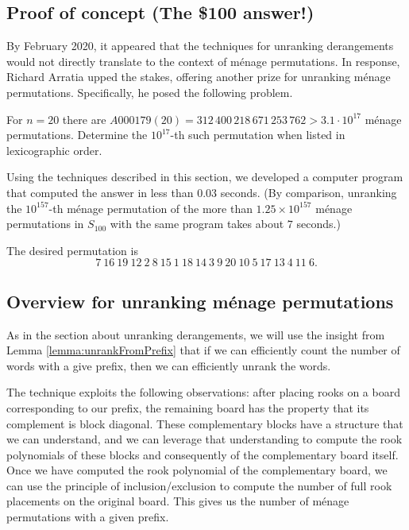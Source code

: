 \subsection{Proof of concept (The \$100 answer!)}
By February 2020, it appeared that the techniques for unranking derangements
would not directly translate to the context of m\'enage permutations. In
response, Richard Arratia upped the stakes, offering another prize for
unranking m\'enage permutations. Specifically, he posed the following problem.
\begin{problem}
  For $n=20$ there are $A000179(20) = 312\,400\,218\,671\,253\,762 > 3.1\cdot 10^{17}$
  m\'enage permutations.
  Determine the $10^{17}$-th such permutation when listed in lexicographic order.
\end{problem}
Using the techniques described in this section, we developed a computer program that
computed the answer in less than $0.03$ seconds.
(By comparison, unranking the $10^{157}$-th m\'enage permutation of the more
than $1.25 \times 10^{157}$ m\'enage permutations in $S_{100}$
with the same program takes about $7$ seconds.)
\begin{answer}
  The desired permutation is \begin{equation}
    7\ 16\ 19\ 12\ 2\ 8\ 15\ 1\ 18\ 14\ 3\ 9\ 20\ 10\ 5\ 17\ 13\ 4\ 11\ 6.
  \end{equation}
\end{answer}

\subsection{Overview for unranking m\'enage permutations}

As in the section about unranking derangements, we will use the insight from
Lemma \ref{lemma:unrankFromPrefix} that if we can efficiently count the number
of words with a give prefix, then we can efficiently unrank the words.

The technique exploits the following observations:
after placing rooks on a board corresponding to our
prefix, the remaining board has the property that its complement is block
diagonal. These complementary blocks have a structure that we can understand,
and we can leverage that understanding to compute the rook polynomials of these
blocks and consequently of the complementary board itself. Once we have computed
the rook polynomial of the complementary board, we can use the principle of
inclusion/exclusion to compute the number of full rook placements on the
original board.
This gives us the number of m\'enage permutations with a given prefix.

